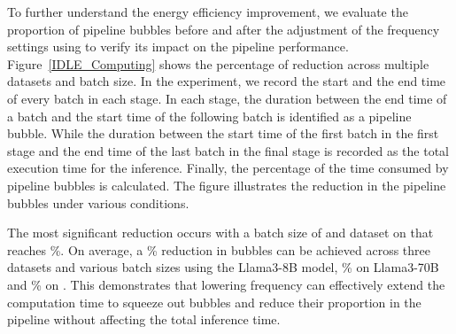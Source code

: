 
To further understand the energy efficiency improvement, we evaluate the proportion of pipeline bubbles before and after the adjustment of the frequency settings using \thisproj{} to verify its impact on the pipeline performance. 
Figure~\ref{IDLE_Computing} shows the percentage of reduction across multiple datasets and batch size.
In the experiment, we record the start and the end time of every batch in each stage. 
In each stage, the duration between the end time of a batch and the start time of the following batch is identified as a pipeline bubble.
While the duration between the start time of the first batch in the first stage and the end time of the last batch in the final stage is recorded as the total execution time for the inference.
Finally, the percentage of the time consumed by pipeline bubbles is calculated.
The figure illustrates the reduction in the pipeline bubbles under various conditions. 

The most significant reduction occurs with a batch size of  and  dataset on  that reaches \%.
On average, a \% reduction in bubbles can be achieved across three datasets and various batch sizes using the Llama3-8B model, \% on Llama3-70B and \% on .
This demonstrates that lowering frequency can effectively extend the computation time to squeeze out bubbles and reduce their proportion in the pipeline without affecting the total inference time.


